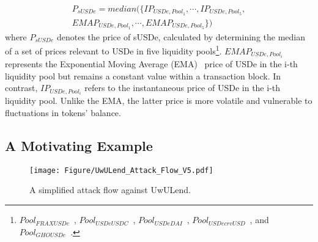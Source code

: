 \begin{equation}
\label{PriceOfsUSDe}
\begin{split}
    P_{sUSDe} = median(\{IP_{USDe,Pool_1},\cdots, IP_{USDe,Pool_5}, \\EMAP_{USDe,Pool_1},\cdots, EMAP_{USDe,Pool_5}\})
\end{split}
\end{equation}
where $P_{sUSDe}$ denotes the price of sUSDe, calculated by determining the median of a set of prices relevant to USDe in five liquidity pools\footnote{$Pool_{FRAXUSDe}$~\cite{FRAXUSDe}, $Pool_{USDeUSDC}$~\cite{USDeUSDC}, $Pool_{USDeDAI}$~\cite{USDeDAI}, $Pool_{USDecrvUSD}$~\cite{USDecrvUSD}, and $Pool_{GHOUSDe}$~\cite{GHOUSDe}.}.
$EMAP_{USDe,Pool_i}$ represents the Exponential Moving Average (EMA)~\cite{EMA} price of USDe in the i-th liquidity pool but remains a constant value within a transaction block.
In contrast, $IP_{USDe,Pool_i}$ refers to the instantaneous price of USDe in the i-th liquidity pool. 
Unlike the EMA, the latter price is more volatile and vulnerable to fluctuations in tokens' balance. %




\subsection{A Motivating Example}
\label{sec:motivatingexample}

\begin{figure}[!t]
    \centering
    \texttt{[image: Figure/UwULend\_Attack\_Flow\_V5.pdf]}
    \vspace{-1ex}
    \caption{A simplified attack flow against UwULend.}
    \label{fig:motivationExample}
\end{figure}

